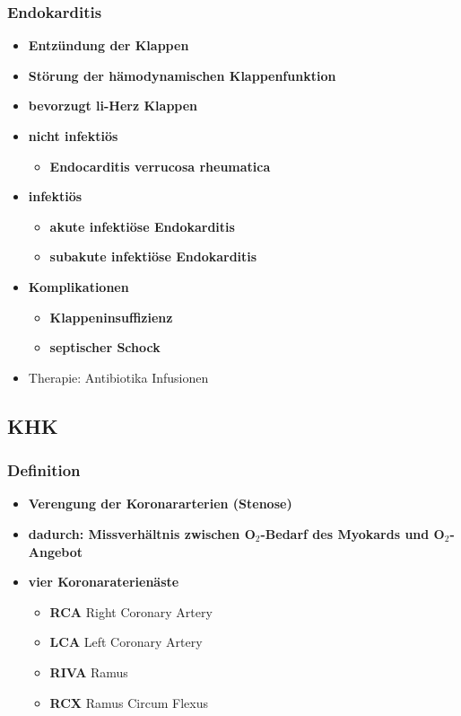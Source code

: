 		\subsubsection{Endokarditis}
			\begin{itemize}
				\item \textbf{Entzündung der Klappen}
				\item \textbf{Störung der hämodynamischen Klappenfunktion}
				\item \textbf{bevorzugt li-Herz Klappen}
				\item \textbf{nicht infektiös}
					\begin{itemize}
						\item \textbf{Endocarditis verrucosa rheumatica}
					\end{itemize}
				\item \textbf{infektiös}
					\begin{itemize}
						\item \textbf{akute infektiöse Endokarditis}
						\item \textbf{subakute infektiöse Endokarditis}
					\end{itemize}
				\item \textbf{Komplikationen}
					\begin{itemize}
						\item \textbf{Klappeninsuffizienz}
						\item \textbf{septischer Schock}
					\end{itemize}
				\item Therapie: Antibiotika Infusionen
			\end{itemize}
	\subsection{KHK}
		\subsubsection{Definition}
			\begin{itemize}
				\item \textbf{Verengung der Koronararterien (Stenose)}
				\item \textbf{dadurch: Missverhältnis zwischen O$_2$-Bedarf des Myokards und O$_2$-Angebot}
				\item \textbf{vier Koronaraterienäste}
					\begin{itemize}
						\item \textbf{RCA} Right Coronary Artery
						\item \textbf{LCA} Left Coronary Artery
						\item \textbf{RIVA} Ramus 
						\item \textbf{RCX} Ramus Circum Flexus
					\end{itemize}
			\end{itemize}
